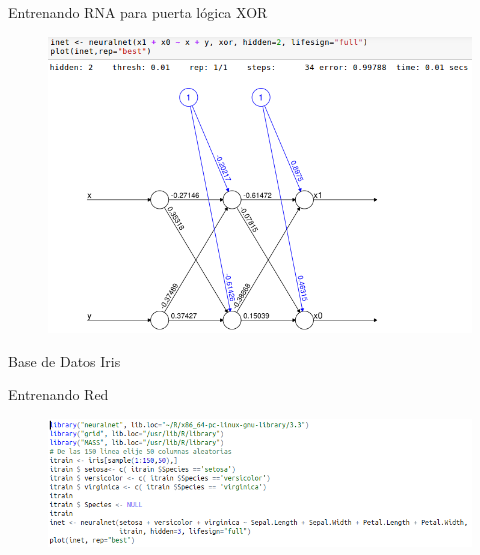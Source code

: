 \documentclass{beamer}
\begin{document}
\begin{frame}
\begin{block}{Entrenando RNA para puerta lógica XOR}
\begin{figure}
\includegraphics[scale=0.4]{neuralnetxor.png}
\centering
\end{figure}
\end{block}
\end{frame}

\begin{frame}{Base de Datos Iris}
\begin{block}{Entrenando Red}
\begin{figure}
\includegraphics[scale=0.4]{entrenando.png}
\centering
\end{figure}
\end{block}
\end{frame}
\end{document}
